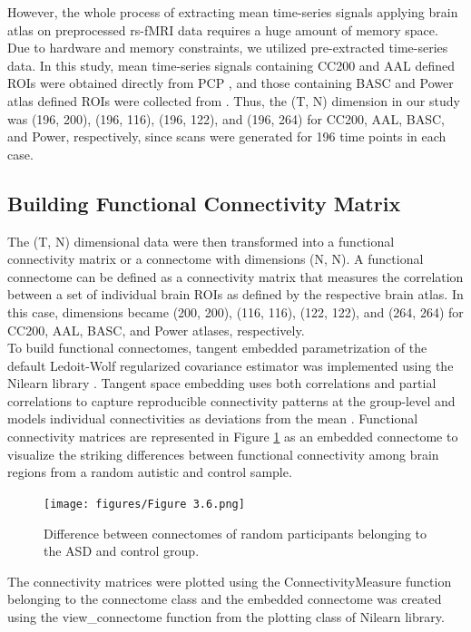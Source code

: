 However, the whole process of extracting mean time-series signals applying brain atlas on preprocessed rs-fMRI data requires a huge amount of memory space. Due to hardware and memory constraints, we utilized pre-extracted time-series data. In this study, mean time-series signals containing CC200 and AAL defined ROIs were obtained directly from PCP \cite{abidepreprocessed}, and those containing BASC and Power atlas defined ROIs were collected from \cite{dadi2019benchmarking}. Thus, the (T, N) dimension in our study was (196, 200), (196, 116), (196, 122), and (196, 264) for CC200, AAL, BASC, and Power, respectively, since scans were generated for 196 time points in each case.

\subsection{Building Functional Connectivity Matrix}

The (T, N) dimensional data were then transformed into a functional connectivity matrix or a connectome with dimensions (N, N). A functional connectome can be defined as a connectivity matrix that measures the correlation between a set of individual brain ROIs as defined by the respective brain atlas. In this case, dimensions became (200, 200), (116, 116), (122, 122), and (264, 264) for CC200, AAL, BASC, and Power atlases, respectively.\\

To build functional connectomes, tangent embedded parametrization of the default Ledoit-Wolf regularized covariance estimator was implemented using the Nilearn library \cite{nilearn}. Tangent space embedding uses both correlations and partial correlations to capture reproducible connectivity patterns at the group-level and models individual connectivities as deviations from the mean \cite{varoquaux_baronnet_kleinschmidt_fillard_thirion_2010}. Functional connectivity matrices are represented in Figure \ref{fig:3.6} as an embedded connectome to visualize the striking differences between functional connectivity among brain regions from a random autistic and control sample.\\

\begin{figure}[h!]
\centering
\texttt{[image: figures/Figure 3.6.png]}
\caption{Difference between connectomes of random participants belonging to the ASD and control group.}
\label{fig:3.6}
\end{figure}

The connectivity matrices were plotted using the ConnectivityMeasure function belonging to the connectome class and the embedded connectome was created using the view\_connectome
function from the plotting class of Nilearn library.

